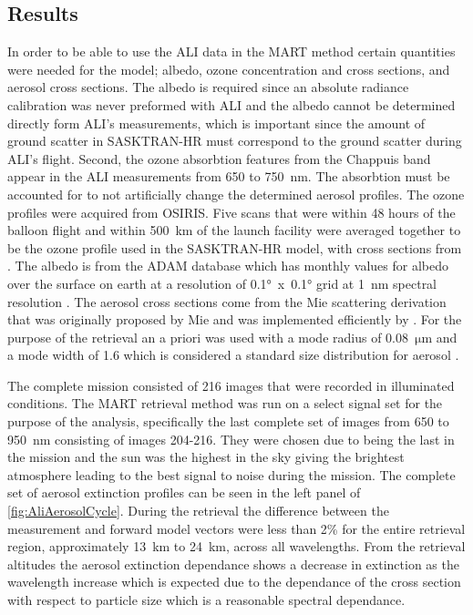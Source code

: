 \documentclass[12pt]{article}
\begin{document}
\subsection{Results}

In order to be able to use the ALI data in the MART method certain quantities were needed for the model; albedo, ozone concentration and cross sections, and aerosol cross sections. The albedo is required since an absolute radiance calibration was never preformed with ALI and the albedo cannot be determined directly form ALI's measurements, which is important since the amount of ground scatter in SASKTRAN-HR must correspond to the ground scatter during ALI's flight. Second, the ozone absorbtion features from the Chappuis band appear in the ALI measurements from 650 to 750~nm. The absorbtion must be accounted for to not artificially change the determined aerosol profiles. The ozone profiles were acquired from OSIRIS. Five scans that were within 48 hours of the balloon flight and  within 500~km of the launch facility were averaged together to be the ozone profile used in the SASKTRAN-HR model, with cross sections from \cite{Burrows1999}. The albedo is from the ADAM database which has monthly values for albedo over the surface on earth at a resolution of 0.1\si{\degree}~x~0.1\si{\degree} grid at 1~nm spectral resolution \citep{Muller2013}. The aerosol cross sections come from the Mie scattering derivation that was originally proposed by Mie and was implemented efficiently by \cite{Wiscombe1980}. For the purpose of the retrieval an a priori was used with a mode radius of 0.08~$\si{\micro\metre}$  and a mode width of 1.6 which is considered a standard size distribution for aerosol \citep{Deshler2003}.

The complete mission consisted of 216 images that were recorded in illuminated conditions. The MART retrieval method was run on a select signal set for the purpose of the analysis, specifically the last complete set of images from 650 to 950~nm consisting of images 204-216. They were chosen due to being the last in the mission and the sun was the highest in the sky giving the brightest atmosphere leading to the best signal to noise during the mission. The complete set of aerosol extinction profiles can be seen in the left panel of \autoref{fig:AliAerosolCycle}. During the retrieval the difference between the measurement and forward model vectors were less than 2\% for the entire retrieval region, approximately 13~km to 24~km, across all wavelengths. From the retrieval altitudes the aerosol extinction dependance shows a decrease in extinction as the wavelength increase which is expected due to the dependance of the cross section with respect to particle size which is a reasonable spectral dependance.
\end{document}
